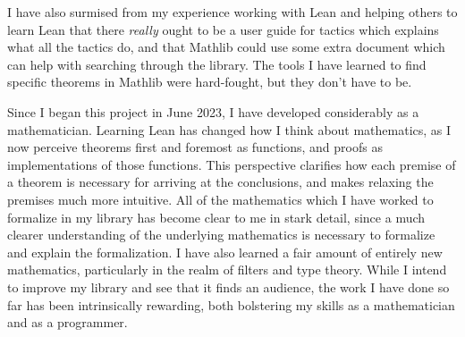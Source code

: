 I have also surmised from my experience working with Lean and helping
others to learn Lean that there \textit{really} ought to be a user guide
for tactics which explains what all the tactics do, and that Mathlib could
use some extra document which can help with searching through the library. 
The tools I have learned to find specific theorems in Mathlib were hard-fought,
but they don't have to be.

Since I began this project in June 2023, I have developed considerably
as a mathematician. Learning Lean has changed how I think about mathematics, 
as I now perceive theorems first and foremost as functions, and proofs
as implementations of those functions. This perspective clarifies how 
each premise of a theorem is necessary for arriving at the conclusions, and
makes relaxing the premises much more intuitive. All of the mathematics which
I have worked to formalize in my library has become clear to me in stark
detail, since a much clearer understanding of the underlying mathematics is
necessary to formalize and explain the formalization. I have also learned 
a fair amount of entirely new mathematics, particularly in the realm
of filters and type theory. While I intend to improve my library and see that
it finds an audience, the work I have done so far has been intrinsically
rewarding, both bolstering my skills as a mathematician and as a programmer.